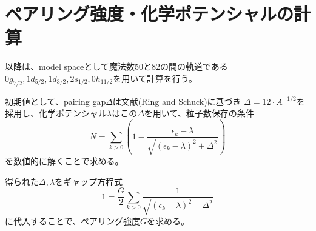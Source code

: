 \documentclass[a4paper]{jsreport}
\begin{document}
  \section{ペアリング強度・化学ポテンシャルの計算}
  以降は、model spaceとして魔法数50と82の間の軌道である\(0g_{7/2},1d_{5/2},1d_{3/2},2s_{1/2},0h_{11/2}\)を用いて計算を行う。

  初期値として、pairing gap\(\Delta\)は文献(Ring and Schuck\cite{thenuclearmanybody})に基づき
  \(\Delta=12\cdot A^{-1/2}\)を採用し、化学ポテンシャル\(\lambda\)はこの\(\Delta\)を用いて、粒子数保存の条件
  \begin{equation}
    N=\sum_{k>0}\left(1-\frac{\epsilon_k - \lambda}{\sqrt{(\epsilon_k-\lambda)^2+\Delta^2}}\right) \label{number2}
  \end{equation}
  を数値的に解くことで求める。

  得られた\(\Delta,\lambda\)をギャップ方程式
  \begin{equation}
    1 = \dfrac{G}{2}\sum_{k>0}\dfrac{1}{\sqrt{(\epsilon_k-\lambda)^2+\Delta^2}} \label{Delta3}
  \end{equation}
  に代入することで、ペアリング強度\(G\)を求める。
\end{document}
